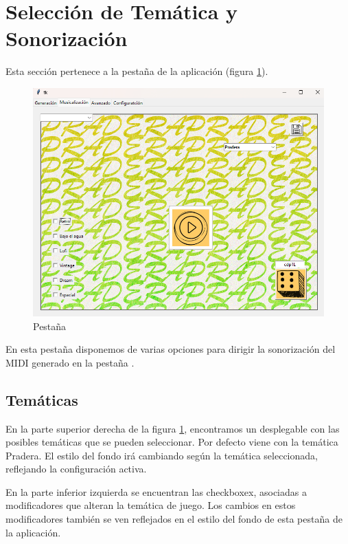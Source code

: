\section{Selección de Temática y Sonorización}
\label{sec:SeleccionTematica}

Esta sección pertenece a la pestaña \tematicTabName{} de la aplicación (figura \ref{fig:tematicTab}). 

\begin{figure}[h]
    \begin{center}
        \includegraphics[scale=0.75]{Imagenes/Bitmap/tematicTab.png}
    \end{center}
    \caption{Pestaña \tematicTabName{}}
    \label{fig:tematicTab}
\end{figure}

En esta pestaña disponemos de varias opciones para dirigir la sonorización del MIDI generado en la pestaña .

\subsection{Temáticas}
\label{subsec:app:themes}
En la parte superior derecha de la figura \ref{fig:tematicTab}, encontramos un desplegable con las posibles temáticas que se pueden seleccionar. Por defecto viene con la temática Pradera. El estilo del fondo irá cambiando según la temática seleccionada, reflejando la configuración activa. 

En la parte inferior izquierda se encuentran las checkboxex, asociadas a modificadores que alteran la temática de juego. Los cambios en estos modificadores también se ven reflejados en el estilo del fondo de esta pestaña de la aplicación.

